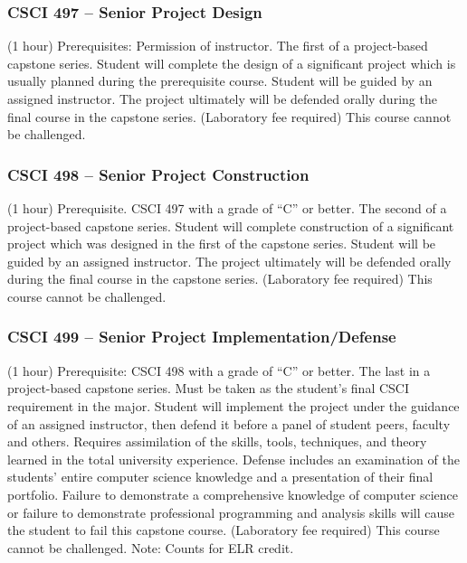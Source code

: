 \subsubsection{CSCI 497 -- Senior Project Design}
(1 hour) Prerequisites: Permission of instructor. The first of a project-based capstone series. Student will complete the design of a significant project which is usually planned during the prerequisite course. Student will be guided by an assigned instructor. The project ultimately will be defended orally during the final course in the capstone series. (Laboratory fee required) This course cannot be challenged.

\clearpage

\subsubsection{CSCI 498 -- Senior Project Construction}
(1 hour) Prerequisite. CSCI 497 with a grade of “C” or better. The second of a project-based capstone series. Student will complete construction of a significant project which was designed in the first of the capstone series. Student will be guided by an assigned instructor. The project ultimately will be defended orally during the final course in the capstone series. (Laboratory fee required) This course cannot be challenged.

\subsubsection{CSCI 499 -- Senior Project Implementation/Defense}
(1 hour) Prerequisite: CSCI 498 with a grade of “C” or better. The last in a project-based capstone series. Must be taken as the student’s final CSCI requirement in the major. Student will implement the project under the guidance of an assigned instructor, then defend it before a panel of student peers, faculty and others. Requires assimilation of the skills, tools, techniques, and theory learned in the total university experience. Defense includes an examination of the students’ entire computer science knowledge and a presentation of their final portfolio. Failure to demonstrate a comprehensive knowledge of computer science or failure to demonstrate professional programming and analysis skills will cause the student to fail this capstone course. (Laboratory fee required) This course cannot be challenged. Note: Counts for ELR credit.

